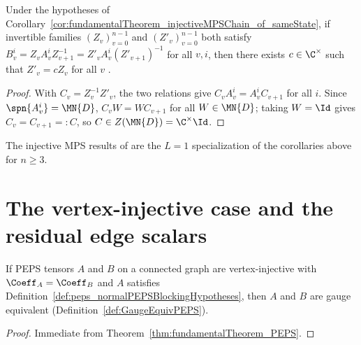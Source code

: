 \begin{lemma}%
    \label{thm:fundamentalTheorem_injectiveMPSChain_gauge_unique}
    \leanok
    Under the hypotheses of
    Corollary~\ref{cor:fundamentalTheorem_injectiveMPSChain_of_sameState}, if
    invertible families $(Z_v)_{v=0}^{n-1}$ and $(Z'_v)_{v=0}^{n-1}$ both satisfy
    $B_v^i=Z_vA_v^iZ_{v+1}^{-1}=Z'_vA_v^i(Z'_{v+1})^{-1}$ for all $v,i$, then
    there exists $c\in\C^\times$ such that $Z'_v=cZ_v$ for all $v$
    \cite[line~724]{Molnar2018NormalPEPS}.
\end{lemma}
\begin{proof}\leanok
    With $C_v=Z_v^{-1}Z'_v$, the two relations give $C_v A_v^i = A_v^i C_{v+1}$
    for all $i$. Since $\spn\{A_v^i\}=\MN{D}$, $C_v W = W C_{v+1}$ for all
    $W\in\MN{D}$; taking $W=\Id$ gives $C_v=C_{v+1}=:C$, so $C\in Z(\MN{D})=\C^\times\Id$.
\end{proof}

The injective MPS results of \cite[Section~3]{Molnar2018NormalPEPS} are the
$L=1$ specialization of the corollaries above for $n\ge 3$.

\section{The vertex-injective case and the residual edge scalars}

\begin{corollary}%
    \label{thm:fundamentalTheorem_normalPEPS_of_vertexInjective}
    \leanok
    If PEPS tensors $A$ and $B$ on a connected graph are vertex-injective with
    $\Coeff_A=\Coeff_B$ and $A$ satisfies
    Definition~\ref{def:peps_normalPEPSBlockingHypotheses}, then $A$ and $B$ are
    gauge equivalent (Definition~\ref{def:GaugeEquivPEPS}).
\end{corollary}
\begin{proof}\leanok
    Immediate from Theorem~\ref{thm:fundamentalTheorem_PEPS}.
\end{proof}

